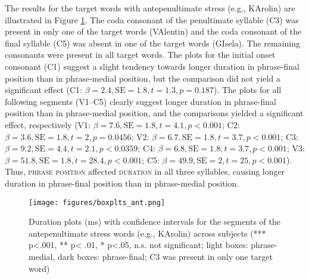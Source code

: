 \documentclass[output=paper]{langscibook}
\begin{document}
The results for the target words with antepenultimate stress (e.g., KArolin) are illustrated in Figure \ref{fig:ant}. The coda consonant of the penultimate syllable (C3) was present in only one of the target words (VAlentin) and the coda consonant of the final syllable (C5) was absent in one of the target words (GIsela). The remaining consonants were present in all target words. The plots for the initial onset consonant (C1) suggest a slight tendency towards longer duration in phrase-final position than in phrase-medial position, but the comparison did not yield a significant effect (C1: $\beta=2.4,\allowbreak \text{SE}=1.8,\allowbreak t=1.3,\allowbreak p=0.187$). The plots for all following segments (V1--C5) clearly suggest longer duration in phrase-final position than in phrase-medial position, and the comparisons yielded a significant effect, respectively (V1: $\beta=7.6,\allowbreak \text{SE}=1.8,\allowbreak t=4.1,\allowbreak p<0.001$; C2: $\beta=3.6,\allowbreak \text{SE}=1.8,\allowbreak t=2,\allowbreak p=0.0456$; V2: $\beta=6.7,\allowbreak \text{SE}=1.8,\allowbreak t=3.7,\allowbreak p<0.001$; C3: $\beta=9.2,\allowbreak \text{SE}=4.4,\allowbreak t=2.1,\allowbreak p<0.0359$; C4: $\beta=6.8,\allowbreak \text{SE}=1.8,\allowbreak t=3.7,\allowbreak p<0.001$; V3: $\beta=51.8,\allowbreak \text{SE}=1.8,\allowbreak t=28.4,\allowbreak p<0.001$; C5: $\beta=49.9,\allowbreak \text{SE}=2,\allowbreak t=25,\allowbreak p<0.001$). Thus, \textsc{phrase position} affected \textsc{duration} in all three syllables, causing longer duration in phrase-final position than in phrase-medial position.

\begin{figure}%
    \centering
    \texttt{[image: figures/boxplts\_ant.png]}
    \caption{Duration plots (ms) with confidence intervals for the segments of the antepenultimate stress words (e.g., KArolin) across subjects (*** p<.001, ** p< .01, * p<.05, n.s. not significant; light boxes: phrase-medial, dark boxes: phrase-final; C3 was present in only one target word)}
    \label{fig:ant}
\end{figure}
\end{document}
